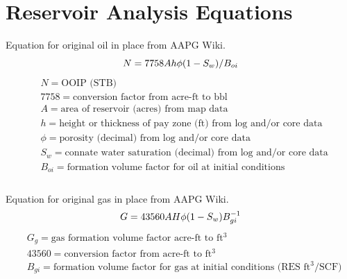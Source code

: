 \documentclass[fleqn]{article}
\begin{document}
\clearpage
\appendix
\renewcommand{\theequation}{\thesection.\arabic{equation}}

\section{Reservoir Analysis Equations}

Equation for original oil in place from AAPG Wiki.
{\setlength{\mathindent}{0cm}
\begin{equation} \label{eq:OrigionalOil}
    N = 7758Ah\phi(1-S_w)/B_{oi} \\
\end{equation}
\begin{equation*}
    \begin{aligned}
    & N = \text{OOIP (STB)} \\
    & 7758 = \text{conversion factor from acre-ft to bbl} \\
    & A = \text{area of reservoir (acres) from map data} \\
    & h = \text{height or thickness of pay zone (ft) from log and/or core data} \\
    & \phi = \text{porosity (decimal) from log and/or core data} \\
    & S_w = \text{connate water saturation (decimal) from log and/or core data} \\
    & B_{oi} = \text{formation volume factor for oil at initial conditions} \\
    \end{aligned}
\end{equation*}} \\

\noindent
Equation for original gas in place from AAPG Wiki.
{\setlength{\mathindent}{0cm}
\begin{equation} \label{eq:OrigionalGas}
    G = 43560AH\phi(1-S_w)B^{-1}_{gi} \\
\end{equation}
\begin{equation*}
    \begin{aligned}
    & G_g = \text{gas formation volume factor acre-ft to ft$^3$} \\
    & 43560 = \text{conversion factor from acre-ft to ft$^3$} \\
    & B_{gi} = \text{formation volume factor for gas at initial conditions (RES ft$^3$/SCF)} \\
    \end{aligned}
\end{equation*}} \\
\end{document}
